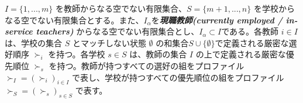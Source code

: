 \documentclass[12pt, a4paper]{article}
\theoremstyle{definition}
\theoremstyle{remark}
\theoremstyle{plain}
\begin{document}







$I = \{1, ..., m\}$ を教師からなる空でない有限集合、$S = \{m+1, ..., n\}$ を学校からなる空でない有限集合とする。また、$I_{\alpha}$を\textbf{\textit{現職教師(currently employed / in-service teachers)}} からなる空でない有限集合とし、$I_{\alpha} \subset I$である。各教師 $i \in I$ は、学校の集合 $S$ とマッチしない状態 $\emptyset$ の和集合$S \cup \{ \emptyset \}$で定義される厳密な選好順序 $\succ_i$ を持つ。各学校 $s \in S$ は、教師の集合 $I$ の上で定義される厳密な優先順位 $\succ_s$ を持つ。教師が持つすべての選好の組をプロファイル $\succ_I = (\succ_i)_{i \in I}$ で表し、学校が持つすべての優先順位の組をプロファイル $\succ_S = (\succ_s)_{s \in S}$ で表す。
\end{document}
